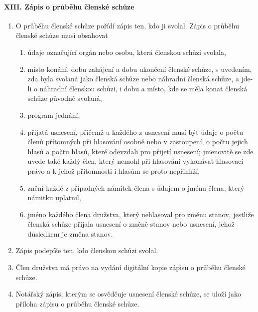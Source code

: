 \paragraph{XIII. Zápis o průběhu členské schůze}
\begin{enumerate}
    \item O průběhu členské schůze pořídí zápis ten, kdo ji svolal. Zápis o průběhu členské schůze musí obsahovat
    \begin{enumerate}[label=\alph*.]
        \item údaje označující orgán nebo osobu, která členskou schůzi svolala,
        \item místo konání, dobu zahájení a dobu ukončení členské schůze, s uvedením, zda byla svolaná jako členská schůze nebo náhradní členská schůze, a jde-li o náhradní členskou schůzi, i dobu a místo, kde se měla konat členská schůze původně svolaná,
        \item program jednání,
        \item přijatá usnesení, přičemž u každého z usnesení musí být údaje o počtu členů přítomných při hlasování osobně nebo v zastoupení, o počtu jejich hlasů a počtu hlasů, které odevzdali pro přijetí usnesení; jmenovitě se zde uvede také každý člen, který nemohl při hlasování vykonávat hlasovací právo a k jehož přítomnosti i hlasům se proto nepřihlíží,
        \item znění každé z případných námitek člena s údajem o jménu člena, který námitku uplatnil,
        \item jméno každého člena družstva, který nehlasoval pro změnu stanov, jestliže členská schůze přijala usnesení o změně stanov nebo usnesení, jehož důsledkem je změna stanov.
    \end{enumerate}
    \item Zápis podepíše ten, kdo členskou schůzi svolal.
    \item Člen družstva má právo na vydání digitální kopie zápisu o průběhu členské schůze. 
    \item Notářský zápis, kterým se osvědčuje usnesení členské schůze, se uloží jako příloha zápisu o průběhu členské schůze.
\end{enumerate}

